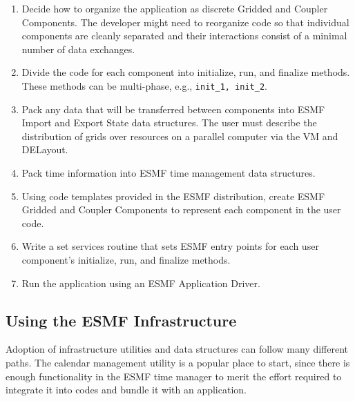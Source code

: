 \begin{enumerate}

\item Decide how to organize the application as discrete Gridded 
and Coupler Components.  The developer might need to reorganize code
so that individual components are cleanly separated and their 
interactions consist of a minimal number of data exchanges.

\item Divide the code for each component into initialize, run, and
finalize methods.  These methods can be multi-phase, e.g., 
{\tt init\_1, init\_2}.

\item Pack any data that will be transferred between components
into ESMF Import and Export State data structures.  The user must 
describe the distribution of grids over resources on a parallel
computer via the VM and DELayout.

\item Pack time information into ESMF time management data 
structures.

\item Using code templates provided in the ESMF distribution, create
ESMF Gridded and Coupler Components to represent each component
in the user code.

\item Write a set services routine that sets ESMF entry 
points for each user component's initialize, run, and finalize 
methods.

\item Run the application using an ESMF Application Driver.

\end{enumerate} 

\subsection{Using the ESMF Infrastructure}

Adoption of infrastructure utilities and data structures can
follow many different paths.  The calendar management utility 
is a popular place to start, since there is enough functionality
in the ESMF time manager to merit the effort required to 
integrate it into codes and bundle it with an application.








